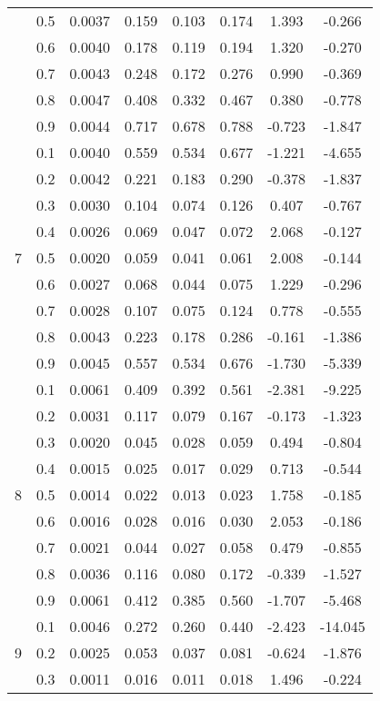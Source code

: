 \documentclass[11pt,a4paper]{report}
\begin{document}
\begin{longtable}{ | c | c || c | c | c | c | c | c | }
 & 0.5 & 0.0037 & 0.159 & 0.103 & 0.174 & 1.393 & -0.266 \\
 & 0.6 & 0.0040 & 0.178 & 0.119 & 0.194 & 1.320 & -0.270 \\
 & 0.7 & 0.0043 & 0.248 & 0.172 & 0.276 & 0.990 & -0.369 \\
 & 0.8 & 0.0047 & 0.408 & 0.332 & 0.467 & 0.380 & -0.778 \\
 & 0.9 & 0.0044 & 0.717 & 0.678 & 0.788 & -0.723 & -1.847 \\
 \hline
\multirow{9}{*}{7} & 0.1 & 0.0040 & 0.559 & 0.534 & 0.677 & -1.221 & -4.655 \\
 & 0.2 & 0.0042 & 0.221 & 0.183 & 0.290 & -0.378 & -1.837 \\
 & 0.3 & 0.0030 & 0.104 & 0.074 & 0.126 & 0.407 & -0.767 \\
 & 0.4 & 0.0026 & 0.069 & 0.047 & 0.072 & 2.068 & -0.127 \\
 & 0.5 & 0.0020 & 0.059 & 0.041 & 0.061 & 2.008 & -0.144 \\
 & 0.6 & 0.0027 & 0.068 & 0.044 & 0.075 & 1.229 & -0.296 \\
 & 0.7 & 0.0028 & 0.107 & 0.075 & 0.124 & 0.778 & -0.555 \\
 & 0.8 & 0.0043 & 0.223 & 0.178 & 0.286 & -0.161 & -1.386 \\
 & 0.9 & 0.0045 & 0.557 & 0.534 & 0.676 & -1.730 & -5.339 \\
 \hline
\multirow{9}{*}{8} & 0.1 & 0.0061 & 0.409 & 0.392 & 0.561 & -2.381 & -9.225 \\
 & 0.2 & 0.0031 & 0.117 & 0.079 & 0.167 & -0.173 & -1.323 \\
 & 0.3 & 0.0020 & 0.045 & 0.028 & 0.059 & 0.494 & -0.804 \\
 & 0.4 & 0.0015 & 0.025 & 0.017 & 0.029 & 0.713 & -0.544 \\
 & 0.5 & 0.0014 & 0.022 & 0.013 & 0.023 & 1.758 & -0.185 \\
 & 0.6 & 0.0016 & 0.028 & 0.016 & 0.030 & 2.053 & -0.186 \\
 & 0.7 & 0.0021 & 0.044 & 0.027 & 0.058 & 0.479 & -0.855 \\
 & 0.8 & 0.0036 & 0.116 & 0.080 & 0.172 & -0.339 & -1.527 \\
 & 0.9 & 0.0061 & 0.412 & 0.385 & 0.560 & -1.707 & -5.468 \\
 \hline
\multirow{9}{*}{9} & 0.1 & 0.0046 & 0.272 & 0.260 & 0.440 & -2.423 & -14.045 \\
 & 0.2 & 0.0025 & 0.053 & 0.037 & 0.081 & -0.624 & -1.876 \\
 & 0.3 & 0.0011 & 0.016 & 0.011 & 0.018 & 1.496 & -0.224 \\

\end{longtable}
\end{document}
